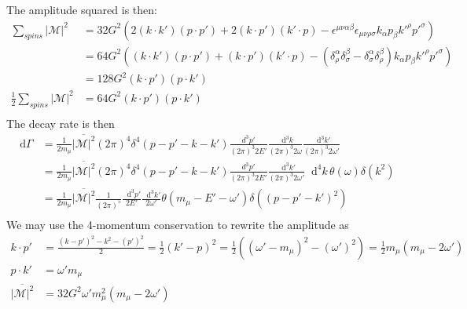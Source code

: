 \documentclass[12pt]{article}
\newcommand{\diff}{\mathop{}\!\mathrm{d}}
\theoremstyle{definition}
\begin{document}
The amplitude squared is then:
\begin{equation*}
\begin{split}
    \sum_{spins} |\mathcal{M}|^2
        &= 32G^2 \left( 2(k \cdot k') (p \cdot p') + 2(k \cdot p')(k' \cdot p) - \epsilon^{\mu\nu\alpha\beta} \epsilon_{\mu\nu\rho\sigma} k_\alpha p_\beta k'^\rho p'^\sigma \right) \\
        &= 64G^2 \left( (k \cdot k') (p \cdot p') + (k \cdot p')(k' \cdot p) - (\delta^\alpha_\rho \delta^\beta_\sigma - \delta^\alpha_\sigma \delta^\beta_\rho) k_\alpha p_\beta k'^\rho p'^\sigma \right) \\
        &= 128G^2 (k \cdot p') (p \cdot k') \\
    \frac{1}{2} \sum_{spins} |\mathcal{M}|^2 &= 64 G^2 (k \cdot p') (p \cdot k') \\
\end{split}
\end{equation*}
The decay rate is then
\begin{equation*}
\begin{split}
    \diff \Gamma
        &= \frac{1}{2m_\mu} \overline{|\mathcal{M}|^2} (2\pi)^4 \delta^4(p - p' - k - k') \frac{d^3p'}{(2\pi)^3 2E'} \frac{\diff^3 k}{(2\pi)^3 2\omega} \frac{\diff^3 k'}{(2\pi)^3 2\omega'} \\
        &= \frac{1}{2m_\mu} \overline{|\mathcal{M}|^2} (2\pi)^4 \delta^4(p - p' - k - k') \frac{d^3 p'}{(2\pi)^3 2E'} \frac{\diff^3 k'}{(2\pi)^3 2\omega'} \diff^4 k \, \theta(\omega) \delta(k^2) \\
        &= \frac{1}{2m_\mu} \overline{|\mathcal{M}|^2} \frac{1}{(2\pi)^5} \frac{\diff^3 p'}{2E'} \frac{\diff^3 k'}{2\omega'} \theta(m_\mu - E' - \omega') \delta((p - p' - k')^2) \\
\end{split}
\end{equation*}
We may use the 4-momentum conservation to rewrite the amplitude as
\begin{equation*}
\begin{split}
    k \cdot p' &= \frac{(k - p')^2 - k^2 - (p')^2}{2} = \frac{1}{2} (k' - p)^2 = \frac{1}{2}((\omega' - m_\mu)^2 - (\omega')^2) = \frac{1}{2} m_\mu (m_\mu - 2\omega') \\
    p \cdot k' &= \omega' m_\mu \\
    \overline{|\mathcal{M}|^2} &= 32 G^2 \omega' m_\mu^2 (m_\mu - 2\omega') \\
\end{split}
\end{equation*}
\end{document}
